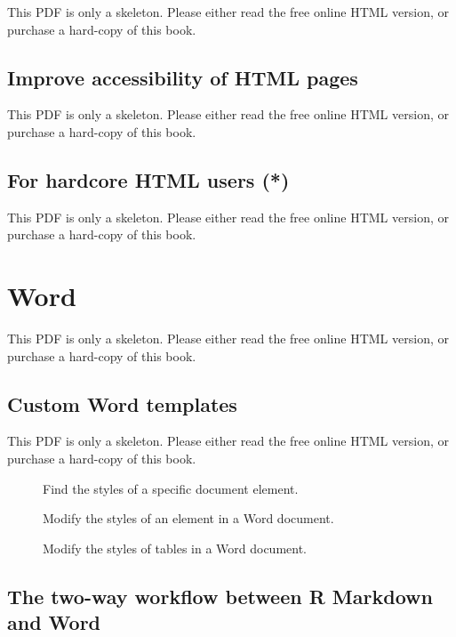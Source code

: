 \documentclass[
  11pt,
]{krantz}
\begin{document}
This PDF is only a skeleton. Please either read the free online HTML version, or purchase a hard-copy of this book.

\section{Improve accessibility of HTML pages}\label{html-accessibility}

This PDF is only a skeleton. Please either read the free online HTML version, or purchase a hard-copy of this book.

\section{For hardcore HTML users (*)}\label{html-hardcore}

This PDF is only a skeleton. Please either read the free online HTML version, or purchase a hard-copy of this book.

\chapter{Word}\label{word}

This PDF is only a skeleton. Please either read the free online HTML version, or purchase a hard-copy of this book.

\section{Custom Word templates}\label{word-template}

This PDF is only a skeleton. Please either read the free online HTML version, or purchase a hard-copy of this book.

\begin{figure}\caption{Find the styles of a specific document element.}\end{figure}

\begin{figure}\caption{Modify the styles of an element in a Word document.}\end{figure}

\begin{figure}\caption{Modify the styles of tables in a Word document.}\end{figure}

\section{The two-way workflow between R Markdown and Word}\label{word-redoc}
\end{document}
